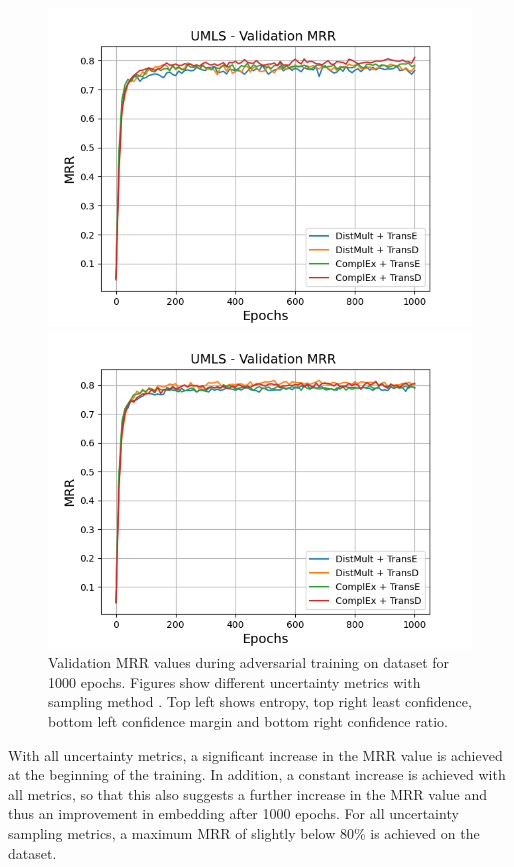 \begin{figure}
\begin{minipage}{.5\textwidth}
    \end{minipage}
    \begin{minipage}{.5\textwidth}
      \centering
      \includegraphics[width=0.9\linewidth]{figures/results/gan_train/not_pretrained/uncertainty/max_distribution/confidence_margin/umls/uncertainty_umls_mrrs.png}
    \end{minipage}%
    \begin{minipage}{.5\textwidth}
      \centering
      \includegraphics[width=0.9\linewidth]{figures/results/gan_train/not_pretrained/uncertainty/max_distribution/confidence_ratio/umls/uncertainty_umls_mrrs.png}
    \end{minipage}%
    \caption{Validation MRR values during adversarial training on \umls dataset for 1000 epochs. 
    Figures show different uncertainty metrics with sampling method  \ussoftmax.
    Top left shows entropy, top right least confidence, 
    bottom left confidence margin and bottom right confidence ratio.}
    \label{fig:advtrain_metrics_umls}
\end{figure}
With all uncertainty metrics, a significant increase in the MRR value is achieved at the beginning of the training.
In addition, a constant increase is achieved with all metrics, so that this also suggests a further increase in the MRR value and thus an improvement in embedding after 1000 epochs.
For all uncertainty sampling metrics, a maximum MRR of slightly below 80\% is achieved on the \umls dataset.


